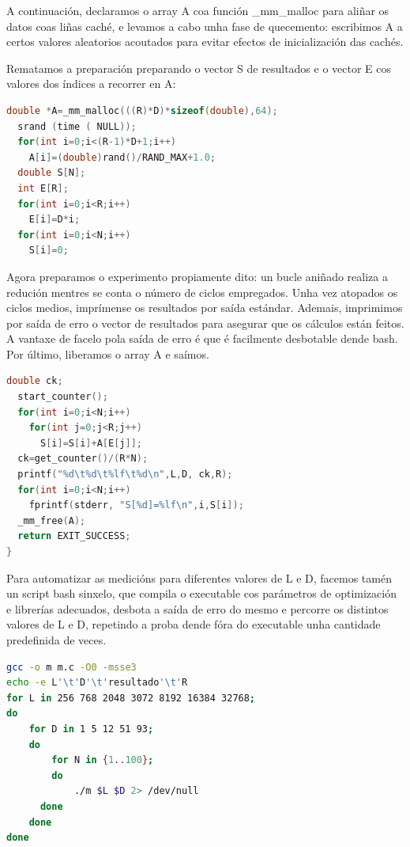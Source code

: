 \documentclass[letterpaper, 10 pt,spanish, conference]{ieeeconf}  %
\begin{document}
    A continuación, declaramos o array A coa función \_mm\_malloc para aliñar os datos coas liñas caché, e levamos a cabo unha fase de quecemento: escribimos A a certos valores aleatorios acoutados para evitar efectos de inicialización das cachés.
    
    Rematamos a preparación preparando o vector S de resultados e o vector E cos valores dos índices a recorrer en A:
\begin{lstlisting}[language=C++, caption=Preparación]
  double *A=_mm_malloc(((R)*D)*sizeof(double),64);
  srand (time ( NULL));
  for(int i=0;i<(R-1)*D+1;i++)
    A[i]=(double)rand()/RAND_MAX+1.0;
  double S[N];
  int E[R];
  for(int i=0;i<R;i++)
    E[i]=D*i;
  for(int i=0;i<N;i++)
    S[i]=0;
\end{lstlisting}
    
    Agora preparamos o experimento propiamente dito: un bucle aniñado realiza a redución mentres se conta o número de ciclos empregados. Unha vez atopados os ciclos medios, imprímense os resultados por saída estándar. Ademais, imprimimos por saída de erro o vector de resultados para asegurar que os cálculos están feitos. A vantaxe de facelo pola saída de erro é que é facilmente desbotable dende bash.
    Por último, liberamos o array A e saímos.
    
\begin{lstlisting}[language=C++, caption=Experimento]
  double ck;
  start_counter();
  for(int i=0;i<N;i++)
    for(int j=0;j<R;j++)
      S[i]=S[i]+A[E[j]];
  ck=get_counter()/(R*N);
  printf("%d\t%d\t%lf\t%d\n",L,D, ck,R);
  for(int i=0;i<N;i++)
    fprintf(stderr, "S[%d]=%lf\n",i,S[i]);
  _mm_free(A);
  return EXIT_SUCCESS;
}
\end{lstlisting}
    
    Para automatizar as medicións para diferentes valores de L e D, facemos tamén un script bash sinxelo, que compila o executable cos parámetros de optimización e librerías adecuados, desbota a saída de erro do mesmo e percorre os distintos valores de L e D, repetindo a proba dende fóra do executable unha cantidade predefinida de veces.
    
\begin{lstlisting}[language=bash, caption=Script de bash]
gcc -o m m.c -O0 -msse3
echo -e L'\t'D'\t'resultado'\t'R
for L in 256 768 2048 3072 8192 16384 32768;
do
	for D in 1 5 12 51 93;
	do
		for N in {1..100};
		do
			./m $L $D 2> /dev/null
	  done
	done
done
\end{lstlisting}
    
\end{document}
